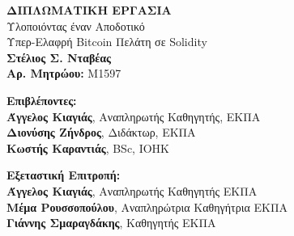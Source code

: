 \begin{center}
\begin{normalsize}
    \vspace{3cm}
    \textbf{ΔΙΠΛΩΜΑΤΙΚΗ ΕΡΓΑΣΙΑ}\\
    \vspace{3cm}
    Υλοποιόντας έναν Αποδοτικό\\
    Υπερ-Ελαφρή Bitcoin Πελάτη σε Solidity\\
    \vspace{3cm}
    \textbf{Στέλιος Σ. Νταβέας}\\
    \textbf{Αρ. Μητρώου:} M1597
    \vspace{5cm}
    \begin{flushleft}
        \textbf{Επιβλέποντες:}\\
        \hspace{1.5cm}
        \textbf{Άγγελος Κιαγιάς}, Αναπληρωτής Καθηγητής, ΕΚΠΑ\\
        \hspace{1.5cm}
        \textbf{Διονύσης Ζήνδρος}, Διδάκτωρ, ΕΚΠΑ\\
        \hspace{1.5cm}
        \textbf{Κωστής Καραντιάς}, BSc, IOHK

        \vspace{1cm}

        \textbf{Εξεταστική Επιτροπή:}\\
        \hspace{1.5cm}
        \textbf{Άγγελος Κιαγιάς}, Αναπληρωτής Καθηγητής ΕΚΠΑ\\
        \hspace{1.5cm}
        \textbf{Μέμα Ρουσσοπούλου}, Αναπληρώτρια Καθηγήτρια ΕΚΠΑ\\
        \hspace{1.5cm}
        \textbf{Γιάννης Σμαραγδάκης}, Καθηγητής ΕΚΠΑ

    \end{flushleft}
\end{normalsize}
\end{center}

\pagebreak
